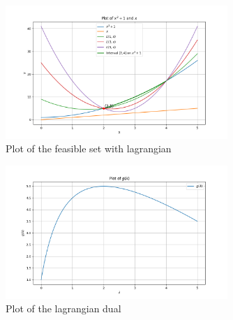 \begin{figure}[htbp]
  \centerline{\includegraphics[width=0.75\textwidth]{hw4/5_1_part_b_1.png}}
  \caption{Plot of the feasible set with lagrangian}
  \label{fig:5_1_b_1}
\end{figure}

\begin{figure}[htbp]
  \centerline{\includegraphics[width=0.75\textwidth]{hw4/5_1_part_b_2.png}}
  \caption{Plot of the lagrangian dual}
  \label{fig:}
\end{figure}